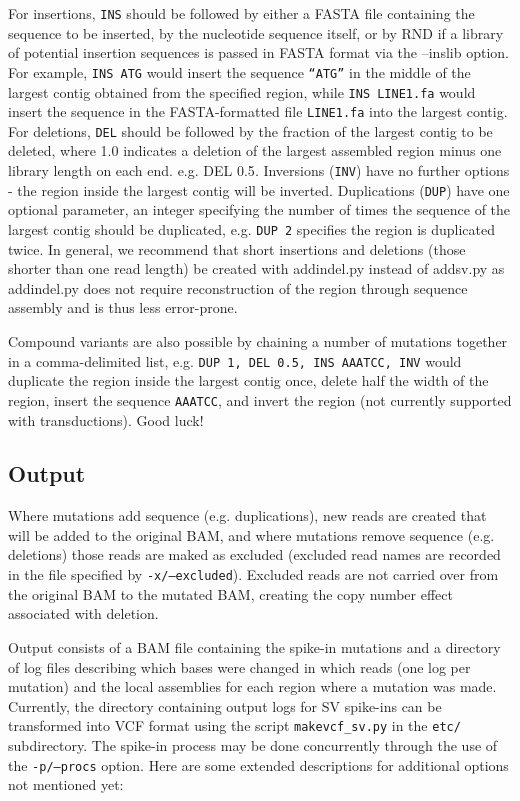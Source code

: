 \documentclass[letterpaper,11pt]{article}
\begin{document}
    For insertions, \texttt{INS} should be followed by either a FASTA file containing the sequence to be inserted, by the nucleotide sequence itself, or by RND if a library of potential insertion sequences is passed in FASTA format via the --inslib option. For example, \texttt{INS ATG} would insert the sequence \texttt{``ATG''} in the middle of the largest contig obtained from the specified region, while \texttt{INS LINE1.fa} would insert the sequence in the FASTA-formatted file \texttt{LINE1.fa} into the largest contig. For deletions, \texttt{DEL} should be followed by the fraction of the largest contig to be deleted, where 1.0 indicates a deletion of the largest assembled region minus one library length on each end. e.g. {DEL 0.5}. Inversions (\texttt{INV}) have no further options - the region inside the largest contig will be inverted. Duplications (\texttt{DUP}) have one optional parameter, an integer specifying the number of times the sequence of the largest contig should be duplicated, e.g. \texttt{DUP 2} specifies the region is duplicated twice. In general, we recommend that short insertions and deletions (those shorter than one read length) be created with addindel.py instead of addsv.py as addindel.py does not require reconstruction of the region through sequence assembly and is thus less error-prone.

    Compound variants are also possible by chaining a number of mutations together in a comma-delimited list, e.g. \texttt{DUP 1, DEL 0.5, INS AAATCC, INV} would duplicate the region inside the largest contig once, delete half the width of the region, insert the sequence \texttt{AAATCC}, and invert the region (not currently supported with transductions). Good luck!

\subsection{Output}
    Where mutations add sequence (e.g. duplications), new reads are created that will be added to the original BAM, and where mutations remove sequence (e.g. deletions) those reads are maked as excluded (excluded read names are recorded in the file specified by \texttt{-x/--excluded}). Excluded reads are not carried over from the original BAM to the mutated BAM, creating the copy number effect associated with deletion.
    
     Output consists of a BAM file containing the spike-in mutations and a directory of log files describing which bases were changed in which reads (one log per mutation) and the local assemblies for each region where a mutation was made. Currently, the directory containing output logs for SV spike-ins can be transformed into VCF format using the script \texttt {makevcf\_sv.py} in the \texttt {etc/} subdirectory. The spike-in process may be done concurrently through the use of the \texttt {-p/--procs} option. Here are some extended descriptions for additional options not mentioned yet:
     
\end{document}

